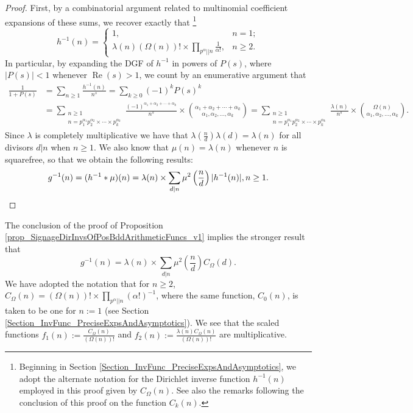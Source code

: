 \documentclass[11pt,reqno,a4letter]{article}
\numberwithin{figure}{section}
\numberwithin{table}{section}
\newcommand{\cf}{\textit{cf.\ }}
\theoremstyle{plain}
\numberwithin{theorem}{section}
\theoremstyle{definition}
\renewcommand{\Re}{\operatorname{Re}}
\begin{document}
\begin{proof}
First, by a combinatorial argument related to multinomial coefficient expansions of these sums, 
we recover exactly that \cite[\cf \S 2]{FROBERG-1968}\footnote{
     Beginning in Section \ref{Section_InvFunc_PreciseExpsAndAsymptotics}, we adopt the alternate 
     notation for the Dirichlet inverse function $h^{-1}(n)$ employed in this proof given by 
     $C_{\Omega}(n)$. See also the remarks following the conclusion of this proof on the 
     function $C_k(n)$. 
} 
\begin{equation} 
\label{eqn_proof_tag_hInvn_ExactNestedSumFormula_CombInterpetIdent_v3} 
h^{-1}(n) = \begin{cases} 
     1, & n = 1; \\ 
     \lambda(n) (\Omega(n))! \times \prod\limits_{p^{\alpha} || n} \frac{1}{\alpha!}, & n \geq 2. 
     \end{cases}
\end{equation} 
In particular, by expanding the DGF of $h^{-1}$ in powers of $P(s)$, where $|P(s)| < 1$ whenever 
$\Re(s) > 1$, we count by an enumerative argument that 
\begin{align*}
\frac{1}{1+P(s)} & = \sum_{n \geq 1} \frac{h^{-1}(n)}{n^s} = \sum_{k \geq 0} (-1)^k P(s)^k \\ 
     & = 
     \sum_{\substack{n \geq 1 \\ n =p_1^{\alpha_1}p_2^{\alpha_2} \times \cdots \times p_k^{\alpha_k}}} 
     \frac{(-1)^{\alpha_1+\alpha_2+\cdots+\alpha_k}}{n^s} \times 
     \binom{\alpha_1+\alpha_2+\cdots+\alpha_k}{\alpha_1,\alpha_2,\ldots,\alpha_k} = 
     \sum_{\substack{n \geq 1 \\ n =p_1^{\alpha_1}p_2^{\alpha_2} \times \cdots \times p_k^{\alpha_k}}} 
     \frac{\lambda(n)}{n^s} \times \binom{\Omega(n)}{\alpha_1,\alpha_2,\ldots,\alpha_k}. 
\end{align*}
Since $\lambda$ is completely multiplicative we have that 
$\lambda\left(\frac{n}{d}\right) \lambda(d) = \lambda(n)$ for all divisors 
$d|n$ when $n \geq 1$. We also know that $\mu(n) = \lambda(n)$ whenever $n$ is squarefree, 
so that we obtain the following results: 
\[
g^{-1}(n) = (h^{-1} \ast \mu)(n) = \lambda(n) \times \sum_{d|n} \mu^2\left(\frac{n}{d}\right) |h^{-1}(n)|, n \geq 1. 
     \qedhere 
\]
\end{proof} 

The conclusion of the proof of 
Proposition \ref{prop_SignageDirInvsOfPosBddArithmeticFuncs_v1} 
implies the stronger result that 
\[
g^{-1}(n) = \lambda(n) \times \sum_{d|n} \mu^2\left(\frac{n}{d}\right) C_{\Omega}(d).  
\]
We have adopted the notation that for $n \geq 2$, 
$C_{\Omega}(n) = (\Omega(n))! \times \prod_{p^{\alpha} || n} (\alpha!)^{-1}$, 
where the same function, $C_0(n)$, is taken to be one for $n := 1$ 
(see Section \ref{Section_InvFunc_PreciseExpsAndAsymptotics}). 
We see that the scaled functions $f_1(n) := \frac{C_{\Omega}(n)}{(\Omega(n))!}$ and 
$f_2(n) := \frac{\lambda(n) C_{\Omega}(n)}{(\Omega(n))!}$ are multiplicative. 
\end{document}
